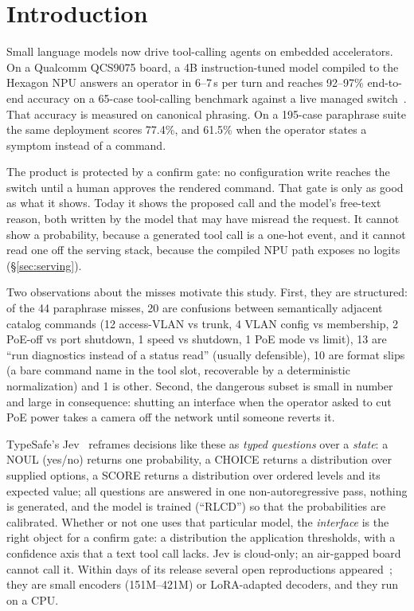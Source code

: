\documentclass[11pt]{article}
\begin{document}
\section{Introduction}

Small language models now drive tool-calling agents on embedded accelerators. On a Qualcomm
QCS9075 board, a 4B instruction-tuned model compiled to the Hexagon NPU answers an operator in
6--7\,s per turn and reaches 92--97\% end-to-end accuracy on a 65-case tool-calling benchmark
against a live managed switch~\cite{lancefindings}. That accuracy is measured on canonical
phrasing. On a 195-case paraphrase suite the same deployment scores 77.4\%, and 61.5\% when
the operator states a symptom instead of a command.

The product is protected by a confirm gate: no configuration write reaches the switch until a
human approves the rendered command. That gate is only as good as what it shows. Today it shows
the proposed call and the model's free-text reason, both written by the model that may have
misread the request. It cannot show a probability, because a generated tool call is a one-hot
event, and it cannot read one off the serving stack, because the compiled NPU path exposes no
logits (\S\ref{sec:serving}).

Two observations about the misses motivate this study. First, they are structured: of the 44
paraphrase misses, 20 are confusions between semantically adjacent catalog commands (12
access-VLAN vs trunk, 4 VLAN config vs membership, 2 PoE-off vs port shutdown, 1 speed vs
shutdown, 1 PoE mode vs limit), 13 are ``run diagnostics instead of a status read'' (usually
defensible), 10 are format slips (a bare command name in the tool slot, recoverable by a
deterministic normalization) and 1 is other. Second, the dangerous subset is small in number
and large in consequence: shutting an interface when the operator asked to cut PoE power takes
a camera off the network until someone reverts it.

TypeSafe's Jev~\cite{jevblog,jevdocs} reframes decisions like these as \emph{typed questions}
over a \emph{state}: a NOUL (yes/no) returns one probability, a CHOICE returns a distribution
over supplied options, a SCORE returns a distribution over ordered levels and its expected
value; all questions are answered in one non-autoregressive pass, nothing is generated, and the
model is trained (``RLCD'') so that the probabilities are calibrated. Whether or not one uses
that particular model, the \emph{interface} is the right object for a confirm gate: a
distribution the application thresholds, with a confidence axis that a text tool call lacks.
Jev is cloud-only; an air-gapped board cannot call it. Within days of its release several open
reproductions appeared~\cite{openjevverdict,laya,openjevdeberta,openjev9b,openjevreadout};
they are small encoders (151M--421M) or LoRA-adapted decoders, and they run on a CPU.
\end{document}
